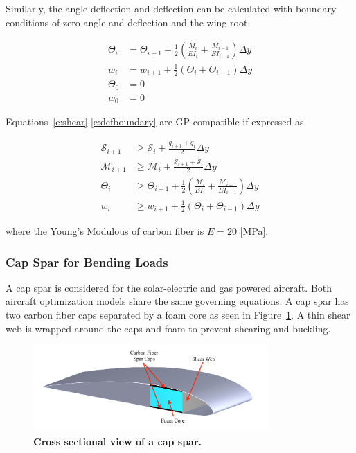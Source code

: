 Similarly, the angle deflection and deflection can be calculated with boundary conditions of zero angle and deflection and the wing root.\cite{bending}

\begin{align}
    \label{e:angle}
    \Theta_{i} &= \Theta_{i+1} + \frac{1}{2} \left(\frac{M_i}{EI_i} + \frac{M_{i-1}}{EI_{i-1}} \right) \Delta y \\
    \label{e:deflection}
    w_{i} &= w_{i+1} + \frac{1}{2} (\Theta_i + \Theta_{i-1}) \Delta y \\
    \label{e:angleboundary}
    \Theta_0 &= 0 \\
    \label{e:defboundary}
    w_0 &= 0 
\end{align}
 
Equations~\eqref{e:shear}-\eqref{e:defboundary} are GP-compatible if expressed as

\begin{align}
    \label{e:sheargp}
    \mathcal{S}_{i+1} &\geq \mathcal{S}_i + \frac{q_{i+1} + q_i}{2} \Delta y \\
    \label{e:momentgp}
    \mathcal{M}_{i+1} &\geq \mathcal{M}_i + \frac{\mathcal{S}_{i+1} + \mathcal{S}_i}{2} \Delta y \\
    \label{e:anglegp}
    \Theta_{i} &\geq \Theta_{i+1} + \frac{1}{2} \left(\frac{\mathcal{M}_i}{EI_i} + \frac{\mathcal{M}_{i-1}}{EI_{i-1}} \right) \Delta y \\
    \label{e:deflection}
    w_{i} &\geq w_{i+1} + \frac{1}{2} (\Theta_i + \Theta_{i-1}) \Delta y 
\end{align}

where the Young's Modulous of carbon fiber is $E = 20$ [MPa]. 

\subsubsection{Cap Spar for Bending Loads}

A cap spar is considered for the solar-electric and gas powered aircraft.  Both aircraft optimization models share the same governing equations.  A cap spar has two carbon fiber caps separated by a foam core as seen in Figure~\ref{f:capspar}. A thin shear web is wrapped around the caps and foam to prevent shearing and buckling.

\begin{figure}[H]
	\begin{center}
	\includegraphics[width=0.8\textwidth,natwidth=3242,natheight=1195]{capspar2.jpg}
    \caption{\textbf{Cross sectional view of a cap spar.}}
	\label{f:capspar}
	\end{center}
\end{figure}

